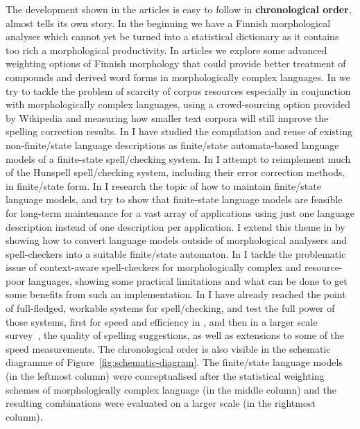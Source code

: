 \documentclass[officiallayout,final]{unihelcompling}
\begin{document}
The development shown in the articles is easy to follow in
\textbf{chronological order}, almost tells its own story. In the beginning we
have a Finnish morphological analyser \citep{pirinen2008suomen} which cannot
yet be turned into a statistical dictionary as it contains too rich a
morphological productivity. In articles
 we explore some advanced
weighting options of Finnish morphology that could provide better treatment of
compounds and derived word forms in morphologically complex languages. In
 we try to tackle the problem of scarcity of
corpus resources especially in conjunction with morphologically complex
languages, using a crowd-sourcing option provided by Wikipedia and measuring
how smaller text corpora will still improve the spelling correction results. In
 I have studied the
compilation and reuse of existing non-finite\-/state language descriptions as
finite\-/state automata-based language models of a finite-state
spell\-/checking system.  In  I attempt to
reimplement much of the Hunspell spell\-/checking system, including their error
correction methods, in finite\-/state form. In
 I research the topic of how to maintain
finite\-/state \glspl{language model}, and try to show that finite-state
language models are feasible for long-term maintenance for a vast array of
applications using just one language description instead of one description per
application.  I extend this theme in  by
showing how to convert language models outside of morphological analysers and
spell-checkers into a suitable finite\-/state automaton. In
 I tackle the problematic issue of
context-aware spell-checkers for morphologically complex and resource-poor
languages, showing some practical limitations and what can be done to get some
benefits from such an implementation. In
 I have already reached the
point of full-fledged, workable systems for spell\-/checking, and test the full
power of those systems, first for speed and efficiency in
, and then in a larger scale
survey~, the quality of spelling suggestions, as
well as extensions to some of the speed measurements.  The chronological order
is also visible in the schematic diagramme of
Figure~\ref{fig:schematic-diagram}. The finite\-/state language models (in the
leftmost column) were conceptualised after the statistical weighting schemes
of morphologically complex language (in the middle column) and the resulting
combinations were evaluated on a larger scale (in the rightmost column).
\end{document}
